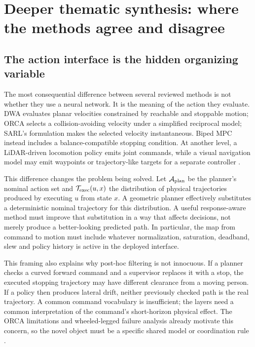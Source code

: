 \section{Deeper thematic synthesis: where the methods agree and disagree}
\label{sec:deep-synthesis}

\subsection{The action interface is the hidden organizing variable}
The most consequential difference between several reviewed methods is not whether
they use a neural network. It is the meaning of the action they evaluate.
DWA evaluates planar velocities constrained by reachable and stoppable motion;
ORCA selects a collision-avoiding velocity under a simplified reciprocal model;
SARL's formulation makes the selected velocity instantaneous. Biped MPC instead
includes a balance-compatible stopping condition. At another level, a LiDAR-driven
locomotion policy emits joint commands, while a visual navigation model may emit
waypoints or trajectory-like targets for a separate controller
\citep{dwa,orca,sarl,biped2016,safehumanoid,flux}.

This difference changes the problem being solved. Let $\mathcal{A}_{\rm plan}$ be
the planner's nominal action set and $\mathcal{T}_{\rm exec}(u,x)$ the distribution
of physical trajectories produced by executing $u$ from state $x$. A geometric
planner effectively substitutes a deterministic nominal trajectory for this
distribution. A useful response-aware method must improve that substitution in
a way that affects decisions, not merely produce a better-looking predicted
path. In particular, the map from command to motion must include whatever
normalization, saturation, deadband, slew and policy history is active in the
deployed interface.

This framing also explains why post-hoc filtering is not innocuous. If a planner
checks a curved forward command and a supervisor replaces it with a stop, the
executed stopping trajectory may have different clearance from a moving person.
If a policy then produces lateral drift, neither previously checked path is the
real trajectory. A common command vocabulary is insufficient; the layers need
a common interpretation of the command's short-horizon physical effect. The
ORCA limitations and wheeled-legged failure analysis already motivate this
concern, so the novel object must be a specific shared model or coordination rule
\citep{orca,wheeledleg}.

